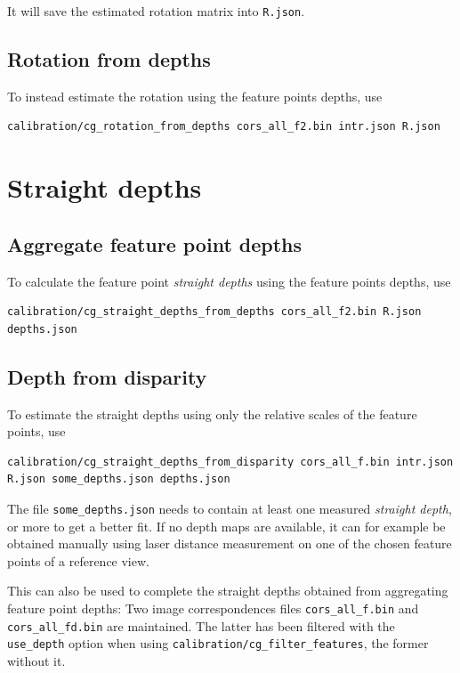 \documentclass[11pt]{scrreprt}
\begin{document}
\noindent It will save the estimated rotation matrix into \texttt{R.json}.


\subsection{Rotation from depths}
To instead estimate the rotation using the feature points depths, use
\begin{lstlisting}[language=bash]
calibration/cg_rotation_from_depths cors_all_f2.bin intr.json R.json
\end{lstlisting}


\section{Straight depths}
\subsection{Aggregate feature point depths}
To calculate the feature point \emph{straight depths} using the feature points depths, use
\begin{lstlisting}[language=bash]
calibration/cg_straight_depths_from_depths cors_all_f2.bin R.json
depths.json
\end{lstlisting}

\subsection{Depth from disparity}
To estimate the straight depths using only the relative scales of the feature points, use
\begin{lstlisting}[language=bash]
calibration/cg_straight_depths_from_disparity cors_all_f.bin intr.json
R.json some_depths.json depths.json
\end{lstlisting}

\noindent The file \texttt{some\_depths.json} needs to contain at least one measured \emph{straight depth}, or more to get a better fit. If no depth maps are available, it can for example be obtained manually using laser distance measurement on one of the chosen feature points of a reference view.

This can also be used to complete the straight depths obtained from aggregating feature point depths: Two image correspondences files \texttt{cors\_all\_f.bin} and \texttt{cors\_all\_fd.bin} are maintained. The latter has been filtered with the \texttt{use\_depth} option when using \texttt{calibration/cg\_filter\_features}, the former without it. 
\end{document}
